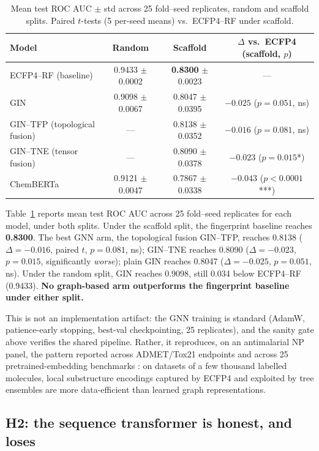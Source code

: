 \documentclass[11pt,a4paper]{article}
\begin{document}
\begin{table}[t]
\centering
\caption{Mean test ROC AUC $\pm$ std across 25 fold--seed replicates, random and scaffold splits. Paired $t$-tests (5 per-seed means) vs.\ ECFP4--RF under scaffold.}
\label{tab:h1}
\begin{tabular}{lccc}
\toprule
Model & Random & Scaffold & $\Delta$ vs.\ ECFP4 (scaffold, $p$) \\
\midrule
ECFP4--RF (baseline) & 0.9433 $\pm$ 0.0002 & \textbf{0.8300} $\pm$ 0.0023 & --- \\
GIN & 0.9098 $\pm$ 0.0067 & 0.8047 $\pm$ 0.0395 & $-0.025$ ($p=0.051$, ns) \\
GIN--TFP (topological fusion) & --- & 0.8138 $\pm$ 0.0352 & $-0.016$ ($p=0.081$, ns) \\
GIN--TNE (tensor fusion) & --- & 0.8090 $\pm$ 0.0378 & $-0.023$ ($p=0.015$*) \\
ChemBERTa & 0.9121 $\pm$ 0.0047 & 0.7867 $\pm$ 0.0338 & $-0.043$ ($p<0.0001$***) \\
\bottomrule
\end{tabular}
\end{table}

Table~\ref{tab:h1} reports mean test ROC AUC across 25 fold--seed replicates for each model, under both splits. Under the scaffold split, the fingerprint baseline reaches \textbf{0.8300}. The best GNN arm, the topological fusion GIN--TFP, reaches 0.8138 ($\Delta = -0.016$, paired $t$, $p = 0.081$, ns); GIN--TNE reaches 0.8090 ($\Delta = -0.023$, $p = 0.015$, significantly \emph{worse}); plain GIN reaches 0.8047 ($\Delta = -0.025$, $p = 0.051$, ns). Under the random split, GIN reaches 0.9098, still 0.034 below ECFP4--RF (0.9433). \textbf{No graph-based arm outperforms the fingerprint baseline under either split.}

This is not an implementation artifact: the GNN training is standard (AdamW, patience-early stopping, best-val checkpointing, 25 replicates), and the sanity gate above verifies the shared pipeline. Rather, it reproduces, on an antimalarial NP panel, the pattern reported across ADMET/Tox21 endpoints \citep{guo_ding_2026} and across 25 pretrained-embedding benchmarks \citep{benchmark_pretrained_2025}: on datasets of a few thousand labelled molecules, local substructure encodings captured by ECFP4 and exploited by tree ensembles are more data-efficient than learned graph representations.

\subsection{H2: the sequence transformer is honest, and loses}
\end{document}
